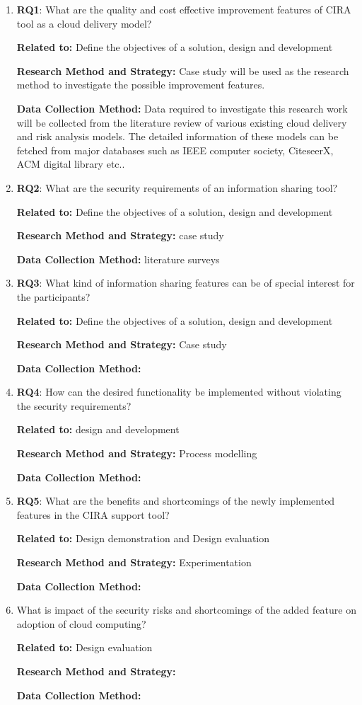 \documentclass[a4paper,twoside,10pt]{report}
\begin{document}
\begin{enumerate}
\item \textbf{RQ1}: What are the quality and cost effective improvement features of CIRA tool as a cloud delivery model?

\textbf{Related to:} Define the objectives of a solution, design and development

\textbf{Research Method and Strategy:} Case study will be used as the research method to investigate the possible improvement features. 

\textbf{Data Collection Method:} Data required to investigate this research work will be collected from the literature review of various existing cloud delivery and risk analysis models. The detailed information of these models can be fetched from major databases such as IEEE computer society, CiteseerX, ACM digital library etc.. 

\item \textbf{RQ2}: What are the security requirements of an information sharing tool?

\textbf{Related to:} Define the objectives of a solution, design and development 

\textbf{Research Method and Strategy:} case study 

\textbf{Data Collection Method:} literature surveys

\item \textbf{RQ3}: What kind of information sharing features can be of special interest for the participants?

\textbf{Related to:} Define the objectives of a solution, design and development

\textbf{Research Method and Strategy:} Case study 

\textbf{Data Collection Method:}

\item \textbf{RQ4}: How can the desired functionality be implemented without violating the security requirements?

\textbf{Related to:} design and development

\textbf{Research Method and Strategy:} Process modelling

\textbf{Data Collection Method:}

\item \textbf{RQ5}: What are the benefits and shortcomings of the newly implemented features in the CIRA support tool?

\textbf{Related to:} Design demonstration and Design evaluation

\textbf{Research Method and Strategy:} Experimentation

\textbf{Data Collection Method:}

\item What is impact of the security risks and shortcomings of the added feature on adoption of cloud computing?

\textbf{Related to:} Design evaluation

\textbf{Research Method and Strategy:}

\textbf{Data Collection Method:}

\end{enumerate}
\end{document}
